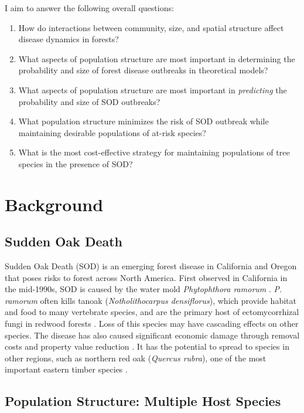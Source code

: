 \documentclass[english,nohyper,nofonts,nobib,nols,twoside]{tufte-handout}
\renewcommand\citep\cite
\begin{document}
I aim to answer the following overall questions:

\begin{enumerate}
\def\labelenumi{\arabic{enumi}.}
\itemsep1pt\parskip0pt
\item
  How do interactions between community, size, and spatial structure
  affect disease dynamics in forests?
\item
  What aspects of population structure are most important in determining
  the probability and size of forest disease outbreaks in theoretical
  models?
\item
  What aspects of population structure are most important in
  \emph{predicting} the probability and size of SOD outbreaks?
\item
  What population structure minimizes the risk of SOD outbreak while
  maintaining desirable populations of at-risk species?
\item
  What is the most cost-effective strategy for maintaining populations
  of tree species in the presence of SOD?
\end{enumerate}

\section{Background}

\subsection{Sudden Oak Death}

Sudden Oak Death (SOD) is an emerging forest disease in California and
Oregon that poses risks to forest across North America. First observed
in California in the mid-1990s, SOD is caused by the water mold
\emph{Phytophthora ramorum} \citep{Rizzo2002}. \emph{P. ramorum} often
kills tanoak (\emph{Notholithocarpus densiflorus}), which provide
habitat and food to many vertebrate species, and are the primary host of
ectomycorrhizal fungi in redwood forests \citep{Rizzo2003}. Loss of this
species may have cascading effects on other species. The disease has
also caused significant economic damage through removal costs and
property value reduction \citep{Kovacs2011}. It has the potential to
spread to species in other regions, such as northern red oak
(\emph{Quercus rubra}), one of the most important eastern timber species
\citep{Rizzo2002}.

\subsection{Population Structure: Multiple Host Species}
\end{document}
